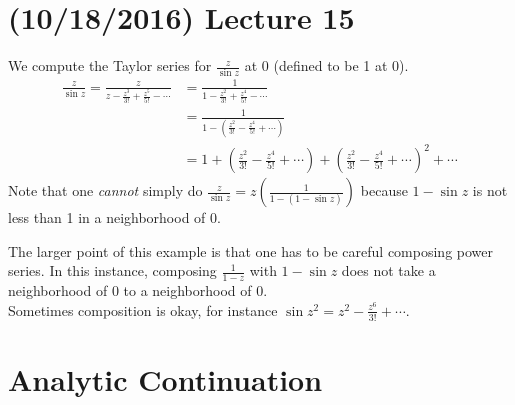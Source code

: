 \documentclass[11pt,leqno,oneside]{amsart}
\begin{document}
  \section{(10/18/2016) Lecture 15}
  \begin{example}
    We compute the Taylor series for $\frac{z}{\sin z}$ at 0 (defined
    to be 1 at 0).
    \begin{align*}
      \frac{z}{\sin z} =
      \frac{z}{z-\frac{z^3}{3!}+\frac{z^5}{5!}-\cdots} & =
                                                         \frac{1}{1-\frac{z^2}{3!}+\frac{z^4}{5!}-\cdots}
      \\
      \ & = \frac{1}{1-(\frac{z^2}{3!}-\frac{z^4}{5!}+\cdots)} \\
      \ & = 1 + (\frac{z^2}{3!} - \frac{z^4}{5!} + \cdots) +
          (\frac{z^2}{3!} - \frac{z^4}{5!} + \cdots)^2 + \cdots
    \end{align*}
    Note that one \emph{cannot} simply do $\frac{z}{\sin z} =
    z(\frac{1}{1-(1-\sin z)})$ because $1-\sin z$ is not less than 1
    in a neighborhood of 0.
  \end{example}
  The larger point of this example is that one has to be careful
  composing power series. In this instance, composing $\frac{1}{1-z}$
  with $1-\sin z$ does not take a neighborhood of 0 to a neighborhood
  of 0. \\

  Sometimes composition is okay, for instance $\sin z^2 = z^2 -
  \frac{z^6}{3!} + \cdots$.

  \section*{Analytic Continuation}
\end{document}
